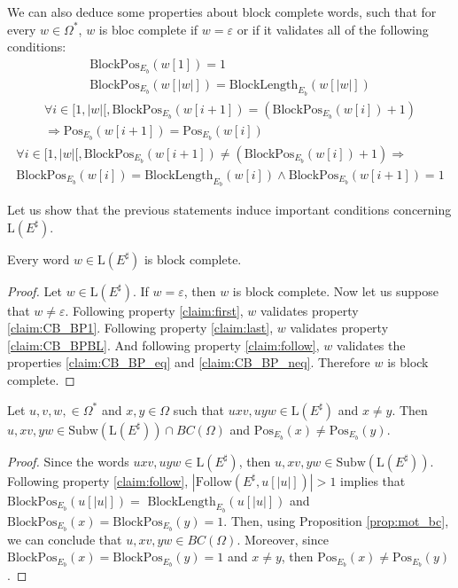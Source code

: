 \documentclass{llncs}
\begin{document}
	
	We can also deduce some properties about block complete words, such that for every $w \in \Omega^*$, $w$ is bloc complete if $w = \varepsilon$ or if it validates all of the following conditions:
	\begin{gather}
		\mathrm{BlockPos}_{E_b}(w[1]) = 1  \label{claim:CB_BP1}\\
		\mathrm{BlockPos}_{E_b}(w[|w|]) = \mathrm{BlockLength}_{E_b}(w[|w|])  \label{claim:CB_BPBL}
	\end{gather}
	\begin{multline}
		\forall i \in [1, |w|[, \mathrm{BlockPos}_{E_b}(w[i+1]) = (\mathrm{BlockPos}_{E_b}(w[i]) + 1)\\
		\Longrightarrow \mathrm{Pos}_{E_b}(w[i+1]) = \mathrm{Pos}_{E_b}(w[i])  \label{claim:CB_BP_eq}
	\end{multline}
	\begin{multline}
		\forall i \in [1, |w|[, \mathrm{BlockPos}_{E_b}(w[i+1]) \neq (\mathrm{BlockPos}_{E_b}(w[i]) + 1) \Longrightarrow \\
		\mathrm{BlockPos}_{E_b}(w[i]) = \mathrm{BlockLength}_{E_b}(w[i]) \wedge \mathrm{BlockPos}_{E_b}(w[i+1]) = 1 \label{claim:CB_BP_neq}
	\end{multline}

	Let us show that the previous statements induce important conditions concerning $\mathrm{L}(E^{\sharp})$.

\begin{proposition}\label{prop:mot_bc}
	Every word $w \in \mathrm{L}(E^{\sharp})$ is block complete.
\end{proposition}
\begin{proof}
	Let $w \in \mathrm{L}(E^{\sharp})$.
	If $w = \varepsilon$, then $w$ is block complete.
	Now let us suppose that $w \neq \varepsilon$.
	Following property \eqref{claim:first}, $w$ validates property \eqref{claim:CB_BP1}.
	Following property \eqref{claim:last}, $w$ validates property \eqref{claim:CB_BPBL}.
	And following property \eqref{claim:follow}, $w$ validates the properties \eqref{claim:CB_BP_eq} and \eqref{claim:CB_BP_neq}.
	Therefore $w$ is block complete.
\end{proof}


\begin{proposition}\label{prop:fourche}
	Let $u, v, w, \in \Omega^*$ and $x, y \in \Omega$ such that $uxv, uyw \in \mathrm{L}(E^{\sharp})$ and $x \neq y$.
	Then $u, xv, yw \in \mathrm{Subw}(\mathrm{L}(E^{\sharp})) \cap BC(\Omega)$ and $\mathrm{Pos}_{E_b}(x) \neq \mathrm{Pos}_{E_b}(y)$.
\end{proposition}
\begin{proof}
	Since the words $uxv, uyw \in \mathrm{L}(E^{\sharp})$, then $u, xv, yw \in \mathrm{Subw}(\mathrm{L}(E^{\sharp}))$.
	Following property \eqref{claim:follow}, $|\mathrm{Follow}(E^{\sharp}, u[|u|])| > 1$ implies that $\mathrm{BlockPos}_{E_b}(u[|u|]) =$ $\mathrm{BlockLength}_{E_b}(u[|u|])$ and $\mathrm{BlockPos}_{E_b}(x) = \mathrm{BlockPos}_{E_b}(y) = 1$.
	Then, using Proposition \ref{prop:mot_bc}, we can conclude that $u, xv, yw \in BC(\Omega)$.
	Moreover, since $\mathrm{BlockPos}_{E_b}(x) = \mathrm{BlockPos}_{E_b}(y) = 1$ and $x \neq y$, then $\mathrm{Pos}_{E_b}(x) \neq \mathrm{Pos}_{E_b}(y)$.
\end{proof}
\end{document}
